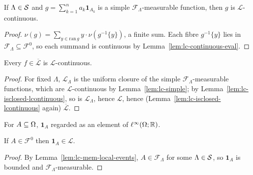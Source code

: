\begin{lemma}
    \label{lem:lc-simple}
    \leanok

    If $\Lambda \in \mathcal{S}$ and $g = \sum_{k=1}^n a_k \mathbf{1}_{A_k}$ is a simple
    $\mathcal{F}_\Lambda$-measurable function, then $g$ is $\mathcal{L}$-continuous.
\end{lemma}
\begin{proof}
    \leanok

    $\nu(g) = \sum_{y \in \mathrm{ran}\, g} y \cdot \nu(g^{-1}\{y\})$, a finite sum. Each fibre
    $g^{-1}\{y\}$ lies in $\mathcal{F}_\Lambda \subseteq \mathcal{F}^0$, so each summand is
    continuous by Lemma~\ref{lem:lc-continuous-eval}.
\end{proof}

\begin{proposition}
    \label{prop:lc-quasilocal-continuous}
    \leanok

    Every $f \in \overline{\mathcal{L}}$ is $\mathcal{L}$-continuous.
\end{proposition}
\begin{proof}
    \leanok

    For fixed $\Lambda$, $\mathcal{L}_\Lambda$ is the uniform closure of the simple
    $\mathcal{F}_\Lambda$-measurable functions, which are $\mathcal{L}$-continuous by
    Lemma~\ref{lem:lc-simple}; by Lemma~\ref{lem:lc-isclosed-lcontinuous}, so is
    $\mathcal{L}_\Lambda$, hence $\mathcal{L}$, hence (Lemma~\ref{lem:lc-isclosed-lcontinuous}
    again) $\overline{\mathcal{L}}$.
\end{proof}

\begin{definition}
    \label{def:lc-indicator}
    \leanok

    For $A \subseteq \Omega$, $\mathbf{1}_A$ regarded as an element of $\ell^\infty(\Omega; \mathbb{R})$.
\end{definition}

\begin{lemma}
    \label{lem:lc-indicator-local}
    \leanok

    If $A \in \mathcal{F}^0$ then $\mathbf{1}_A \in \mathcal{L}$.
\end{lemma}
\begin{proof}
    \leanok

    By Lemma~\ref{lem:lc-mem-local-events}, $A \in \mathcal{F}_\Lambda$ for some
    $\Lambda \in \mathcal{S}$, so $\mathbf{1}_A$ is bounded and $\mathcal{F}_\Lambda$-measurable.
\end{proof}

